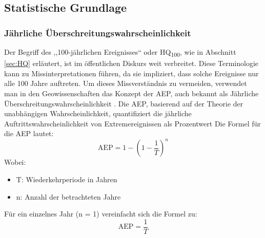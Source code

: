 \subsection{Statistische Grundlage}
\subsubsection{Jährliche Überschreitungswahrscheinlichkeit}
Der Begriff des  ,,100-jährlichen Ereignisses`` oder HQ\textsubscript{100}, wie in Abschnitt \ref{sec:HQ} erläutert, ist im öffentlichen Diskurs weit verbreitet. Diese Terminologie kann zu Missinterpretationen führen, da sie impliziert, dass solche Ereignisse nur alle 100 Jahre auftreten. Um dieses Missverständnis zu vermeiden, verwendet man in den Geowissenschaften das Konzept der \ac{AEP}, auch bekannt als Jährliche Überschreitungswahrscheinlichkeit \parencite{uswrc1981} .
Die \ac{AEP}, basierend auf der Theorie der unabhängigen Wahrscheinlichkeit, quantifiziert die jährliche Auftrittswahrscheinlichkeit von Extremereignissen als Prozentwert
Die Formel für die AEP lautet:
\begin{equation*}
    \text{AEP} = 1 - \left(1 - \frac{1}{T}\right)^n
    \end{equation*}
Wobei:
\begin{itemize}
\item T: Wiederkehrperiode in Jahren
\item n: Anzahl der betrachteten Jahre
\end{itemize}
Für ein einzelnes Jahr (n = 1) vereinfacht sich die Formel zu:
\begin{equation}
\text{AEP} = \frac{1}{T}
\end{equation}


